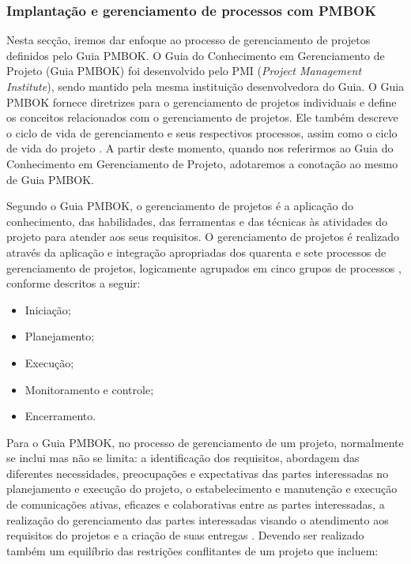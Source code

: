 \documentclass{acm_proc_article-sp}
\begin{document}
\subsubsection{Implantação e gerenciamento de processos com PMBOK}
Nesta secção, iremos dar enfoque ao processo de gerenciamento de projetos definidos pelo Guia PMBOK. O Guia do Conhecimento em Gerenciamento de Projeto (Guia PMBOK) foi desenvolvido pelo PMI (\textit{Project Management Institute}), sendo mantido pela mesma instituição desenvolvedora do Guia. O Guia PMBOK fornece diretrizes para o gerenciamento de projetos individuais e define os conceitos relacionados com o gerenciamento de projetos. Ele também descreve o ciclo de vida de gerenciamento e seus respectivos processos, assim como o ciclo de vida do projeto \cite{pmbok:nAgil}. A partir deste momento, quando nos referirmos ao Guia do Conhecimento em Gerenciamento de Projeto, adotaremos a conotação ao mesmo de Guia PMBOK.

Segundo o Guia PMBOK, o gerenciamento de projetos é a aplicação do conhecimento, das habilidades, das ferramentas e das técnicas às atividades do projeto para atender aos seus requisitos. O gerenciamento de projetos é realizado através da aplicação e integração apropriadas dos quarenta e sete processos de gerenciamento de projetos, logicamente agrupados em cinco grupos de processos \cite{pmbok:nAgil}, conforme descritos a seguir:

\begin{itemize}
\item Iniciação;
\item Planejamento;
\item Execução;
\item Monitoramento e controle;
\item Encerramento.
\end{itemize}

Para o Guia PMBOK, no processo de gerenciamento de um projeto, normalmente se inclui mas não se limita: a identificação dos requisitos, abordagem das diferentes necessidades, preocupações e expectativas das partes interessadas no planejamento e execução do projeto, o estabelecimento e manutenção e execução de comunicações ativas, eficazes e colaborativas entre as partes interessadas, a realização do gerenciamento das partes interessadas visando o atendimento aos requisitos do projetos e a criação de suas entregas \cite{pmbok:nAgil}. Devendo ser realizado também um equilíbrio das restrições conflitantes de um projeto que incluem:
\end{document}
